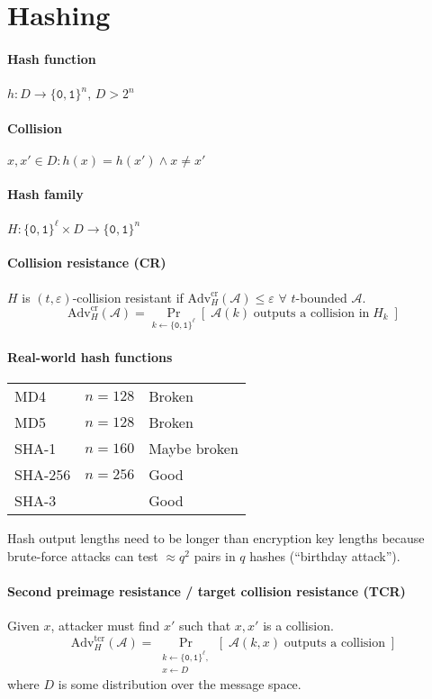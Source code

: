\documentclass[11pt]{article}
\newcommand{\eps}{\ensuremath{\varepsilon}}
\newcommand{\bit}{\ensuremath{\{\texttt{0},\texttt{1}\}}}
\theoremstyle{remark}
\begin{document}
\section{Hashing}

\paragraph{Hash function} $h:D\rightarrow \bit^n$, $D > 2^n$

\paragraph{Collision} $x,x' \in D : h(x)=h(x') \wedge x \neq x'$

\paragraph{Hash family} $H : \bit^\ell \times D \rightarrow \bit^n$

\paragraph{Collision resistance (CR)}
$H$ is $(t,\eps)$-collision resistant if
$\text{Adv}_H^\text{cr}(\mathcal{A}) \le \eps$
$\forall$ $t$-bounded $\mathcal{A}$.
\[ \text{Adv}_H^\text{cr}(\mathcal{A}) = \Pr_{k\leftarrow\bit^\ell}
\left[\;\mathcal{A}(k)\;\textrm{outputs a collision in}\;H_k\;\right] \]

\paragraph{Real-world hash functions}
\begin{tabular}{lrl}
MD4 & $n=128$ & Broken \\
MD5 & $n=128$ & Broken \\
SHA-1 & $n=160$ & Maybe broken \\
SHA-256 & $n=256$ & Good \\
SHA-3 & & Good
\end{tabular}

Hash output lengths need to be longer than encryption key lengths
because brute-force attacks can test $\approx q^2$ pairs in $q$ hashes
(``birthday attack'').

\paragraph{Second preimage resistance / target collision resistance (TCR)}
Given $x$, attacker must find $x'$ such that $x,x'$ is a collision.
\[ \text{Adv}_H^\text{tcr}(\mathcal{A}) =
\Pr_{\substack{k\leftarrow\bit^\ell,\\x\leftarrow D}}
\left[\;\mathcal{A}(k, x)\;\text{outputs a collision}\;\right] \]
where $D$ is some distribution over the message space.
\end{document}
